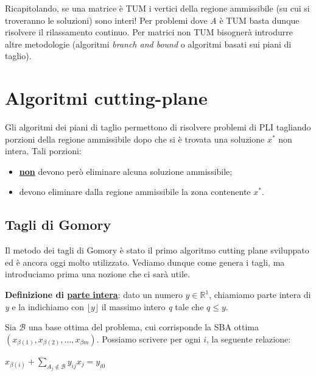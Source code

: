 \documentclass[11pt, oneside]{book}
\begin{document}
\par\bigskip

Ricapitolando, se una matrice \`e TUM i vertici della regione
ammissibile (su cui si troveranno le soluzioni) sono interi! Per
problemi dove {\em A} \`e TUM basta dunque risolvere il rilassamento
continuo. Per matrici non TUM bisogner\`a introdurre altre metodologie
(algoritmi {\em branch and bound} o algoritmi basati sui piani di
taglio).

\section{Algoritmi cutting-plane}

Gli algoritmi dei piani di taglio permettono di risolvere problemi di
PLI tagliando porzioni della regione ammissibile dopo che si \`e
trovata una soluzione $x^*$ non intera. Tali porzioni:

\begin{itemize}
\item {\bf \underline{non}} devono per\`o eliminare alcuna soluzione
  ammissibile;
\item devono eliminare dalla regione ammissibile la zona contenente
  $x^*$.
\end{itemize}

\subsection{Tagli di Gomory}

Il metodo dei tagli di Gomory \`e stato il primo algoritmo cutting
plane sviluppato ed \`e ancora oggi molto utilizzato. Vediamo dunque
come genera i tagli, ma introduciamo prima una nozione che ci sar\`a
utile.

\par\bigskip

{\bf Definizione di \underline{parte intera}}: dato un numero $y \in
\mathbb{R}^1$, chiamiamo parte intera di {\em y} e la indichiamo con
$\lfloor y \rfloor$ il massimo intero {\em q} tale che $q \leq y$.

\par\bigskip

Sia $\mathcal{B}$ una base ottima del problema, cui corrisponde la SBA
ottima $(x_{\beta(1)}, x_{\beta(2)}, \dots, x_{\beta{m}})$. Possiamo
scrivere per ogni $i$, la seguente relazione:

\begin{center}
$x_{\beta(i)} + \sum\limits_{A_j \not\in \mathcal{B}} y_{ij}x_j = y_{i0}$  
\end{center}
\end{document}
